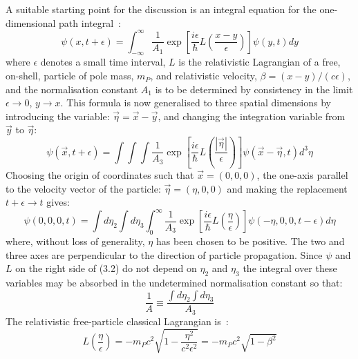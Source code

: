 \documentclass [12pt]{article}
\begin{document}
{   A suitable starting point for the discussion is an integral
  equation for the one-dimensional path integral~\cite{Feyn8}:
  \begin{equation}
 \psi(x,t+\epsilon) = \int_{-\infty}^{\infty}\frac{1}{A_1} \exp\left[
  \frac{i \epsilon}{\hbar} L\left(\frac{x-y}{\epsilon}\right)\right] \psi(y,t) dy
 \end{equation}
 where $\epsilon$ denotes a small time interval, $L$ is the relativistic Lagrangian of 
  a free, on-shell, particle of pole mass, $m_P$, and relativistic velocity,
  $\beta = (x-y)/(c\epsilon)$, and the normalisation constant $A_1$ is to be determined by consistency
   in the limit
  $\epsilon \rightarrow 0$, $y \rightarrow x$. This formula is now generalised to three
   spatial dimensions by introducing the variable: $\vec{\eta} = \vec{x} - \vec{y}$,
   and changing the integration variable from $\vec{y}$ to  $\vec{\eta}$:
  \begin{equation}
 \psi(\vec{x},t+\epsilon) = \int \int \int \frac{1}{A_3} \exp\left[
  \frac{i \epsilon}{\hbar} L\left(\frac{|\vec{\eta}|}{\epsilon}\right)\right]
   \psi( \vec{x}-\vec{\eta},t) d^3\eta
 \end{equation}
   Choosing the
   origin of coordinates such that $\vec{x} = (0,0,0)$, the one-axis parallel to the velocity 
  vector of the particle: $\vec{\eta} = (\eta, 0, 0)$
   and making the replacement $t+\epsilon \rightarrow t$ gives:
  \begin{equation}
 \psi(0,0,0,t) = \int d \eta_2 \int d \eta_3  \int_{0}^{\infty}\frac{1}{A_3} \exp\left[
  \frac{i \epsilon}{\hbar} L\left(\frac{\eta}{\epsilon}\right)\right] \psi(-\eta, 0,0,t-\epsilon) d \eta
 \end{equation}
 where, without loss of generality, $\eta$ has been chosen to be positive.
 The two and three axes are 
  perpendicular to the direction of particle propagation. Since $\psi$ and $L$ on the right side of (3.2)
  do not depend on $\eta_2$ and $\eta_3$ the integral over these variables may be absorbed in the
  undetermined normalisation  constant so that:
  \begin{equation}
   \frac{1}{A} \equiv \frac{\int d \eta_2 \int d \eta_3}{A_3}
  \end{equation}
   The relativistic free-particle classical Lagrangian is~\cite{Goldstein}:
  \begin{equation}
 L\left(\frac{\eta}{\epsilon}\right) = -m_P c^2\sqrt{1-\frac{\eta^2}{c^2 \epsilon^2}}
  = -m_P c^2\sqrt{1-\beta^2}  
  \end{equation}
}
\end{document}
